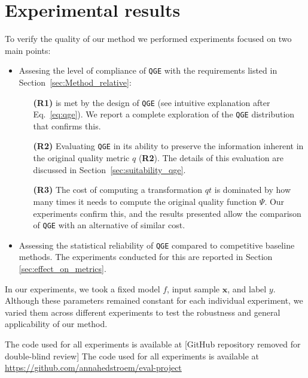 \section{Experimental results}\label{sec:experimental-results}
To verify the quality of our method we performed experiments focused on two main points:

\begin{itemize}
    \item Assesing the level of compliance of \texttt{QGE} with the requirements listed in Section~\ref{sec:Method_relative}:
    \begin{enumerate}
        \item[\textbf{(R1)}] is met by the design of \texttt{QGE} (see intuitive explanation after Eq.~{\ref{eq:qge}}). We report a complete exploration of the \texttt{QGE} distribution that confirms this.
        \item[\textbf{(R2)}] Evaluating \texttt{QGE} in its ability to preserve the information inherent in the original quality metric $q$ (\textbf{R2}). The details of this evaluation are discussed in Section~\ref{sec:suitability_qge}.
        \item[\textbf{(R3)}] The cost of computing a transformation $qt$ is dominated by how many times it needs to compute the original quality function $\Psi$. Our experiments confirm this, and the results presented allow the comparison of \texttt{QGE} with an alternative of similar cost. 
    \end{enumerate}

    \item Assessing the statistical reliability of \texttt{QGE} compared to competitive baseline methods. The experiments conducted for this are reported in Section \ref{sec:effect_on_metrics}. %
\end{itemize}

In our experiments, we took a fixed model $f$, input sample $\mathbf{x}$, and label $y$. Although these parameters remained constant for each individual experiment, we varied them across different experiments to test the robustness and general applicability of our method.

\ifdefined\doubleblind
  The code used for all experiments is available at [GitHub repository removed for double-blind review]
\else
  The code used for all experiments is available at \url{https://github.com/annahedstroem/eval-project}
\fi

